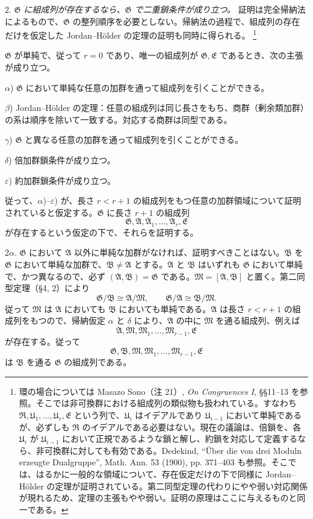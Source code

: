 \documentclass[11pt]{article}
\providecommand{\mR}{\mathfrak{R}}
\providecommand{\mM}{\mathfrak{M}}
\providecommand{\mA}{\mathfrak{A}}
\providecommand{\mB}{\mathfrak{B}}
\providecommand{\mE}{\mathfrak{E}}
\providecommand{\mG}{\mathfrak{G}}
\providecommand{\mU}{\mathfrak{U}}
\begin{document}
2. \emph{$\mG$ に組成列が存在するなら、$\mG$ で二重鎖条件が成り立つ。} 証明は完全帰納法によるもので、$\mG$ の整列順序を必要としない。帰納法の過程で、組成列の存在だけを仮定した Jordan--Hölder の定理の証明も同時に得られる。
\footnote{環の場合については Masazo Sono（注 21）, \emph{On Congruences I}, §§11--13 を参照。そこでは非可換群における組成列の類似物も扱われている。すなわち $\mR,\mU_1,\ldots,\mU_r,\mE$ という列で、$\mU_i$ はイデアルであり $\mU_{i-1}$ において単純であるが、必ずしも $\mR$ のイデアルである必要はない。現在の議論は、倍鎖を、各 $\mU_i$ が $\mU_{i-1}$ において正規であるような鎖と解し、約鎖を対応して定義するなら、非可換群に対しても有効である。Dedekind, ``Über die von drei Moduln erzeugte Dualgruppe'', Math. Ann. 53 (1900), pp. 371--403 も参照。そこでは、はるかに一般的な領域について、存在仮定だけの下で同様に Jordan--Hölder の定理が証明されている。第二同型定理の代わりにやや弱い対応関係が現れるため、定理の主張もやや弱い。証明の原理はここに与えるものと同一である。}

$\mG$ が単純で、従って $r=0$ であり、唯一の組成列が $\mG,\mE$ であるとき、次の主張が成り立つ。

$\alpha$) $\mG$ において単純な任意の加群を通って組成列を引くことができる。

$\beta$) Jordan--Hölder の定理：任意の組成列は同じ長さをもち、商群（剰余類加群）の系は順序を除いて一致する。対応する商群は同型である。

$\gamma$) $\mG$ と異なる任意の加群を通って組成列を引くことができる。

$\delta$) 倍加群鎖条件が成り立つ。

$\varepsilon$) 約加群鎖条件が成り立つ。

従って、$\alpha$)--$\varepsilon$) が、長さ $r<r+1$ の組成列をもつ任意の加群領域について証明されていると仮定する。$\mG$ に長さ $r+1$ の組成列
\[
        \mG,\mA,\mA_1,\ldots,\mA_r,\mE
\]
が存在するという仮定の下で、それらを証明する。

2$\alpha$. $\mG$ において $\mA$ 以外に単純な加群がなければ、証明すべきことはない。$\mB$ を $\mG$ において単純な加群で、$\mB\ne\mA$ とする。$\mA$ と $\mB$ はいずれも $\mG$ において単純で、かつ異なるので、必ず $(\mA,\mB)=\mG$ である。$\mM=[\mA,\mB]$ と置く。第二同型定理（§4, 2）により
\[
        \mG/\mB\cong \mA/\mM,
        \qquad
        \mG/\mA\cong \mB/\mM.
\]
従って $\mM$ は $\mA$ においても $\mB$ においても単純である。$\mA$ は長さ $r<r+1$ の組成列をもつので、帰納仮定 $\alpha$ と $\delta$ により、$\mA$ の中に $\mM$ を通る組成列、例えば
\[
        \mA,\mM,\mM_1,\ldots,\mM_{r-1},\mE
\]
が存在する。従って
\[
        \mG,\mB,\mM,\mM_1,\ldots,\mM_{r-1},\mE
\]
は $\mB$ を通る $\mG$ の組成列である。
\end{document}
